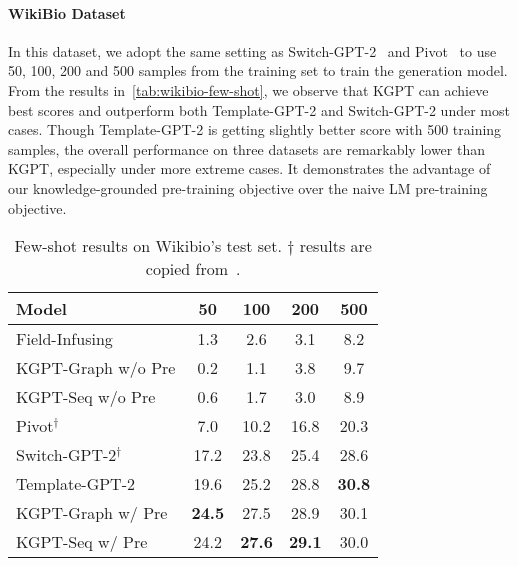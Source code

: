 \documentclass[11pt,a4paper]{article}
\newcommand{\model}{KGPT\xspace}
\begin{document}
\paragraph{WikiBio Dataset}
In this dataset, we adopt the same setting as Switch-GPT-2~\cite{chen2019few} and Pivot~\cite{ma2019key} to use 50, 100, 200 and 500 samples from the training set to train the generation model. From the results in~\autoref{tab:wikibio-few-shot}, we observe that \model can achieve best scores and outperform both Template-GPT-2 and Switch-GPT-2 under most cases. Though Template-GPT-2 is getting slightly better score with 500 training samples, the overall performance on three datasets are remarkably lower than \model, especially under more extreme cases. It demonstrates the advantage of our knowledge-grounded pre-training objective over the naive LM pre-training objective. 
\begin{table}[!thb]
\centering
\small
\begin{tabular}{lcccc}
\hline
Model & 50 & 100 & 200 & 500 \\
\hline
Field-Infusing   &  1.3  & 2.6     &  3.1  &  8.2 \\
\model-Graph w/o Pre  & 0.2  & 1.1  & 3.8  & 9.7 \\
\model-Seq w/o Pre   & 0.6  & 1.7  & 3.0  & 8.9 \\
\hline
Pivot$^{\dagger}$   &    7.0  &   10.2   &   16.8   &    20.3    \\
Switch-GPT-2$^{\dagger}$  &  17.2 &  23.8    &   25.4       &     28.6  \\
Template-GPT-2  & 19.6   & 25.2 & 28.8 & \textbf{30.8} \\
\hline
\model-Graph w/ Pre & \textbf{24.5}  & 27.5  &  28.9  & 30.1  \\
\model-Seq w/ Pre   & 24.2  &  \textbf{27.6}  &  \textbf{29.1} &  30.0 \\
\hline
\end{tabular}
\caption{Few-shot results on Wikibio's test set. ${\dagger}$ results are copied from~\citet{chen2019few}. }
\label{tab:wikibio-few-shot}
\vspace{-2ex}
\end{table}
\end{document}
